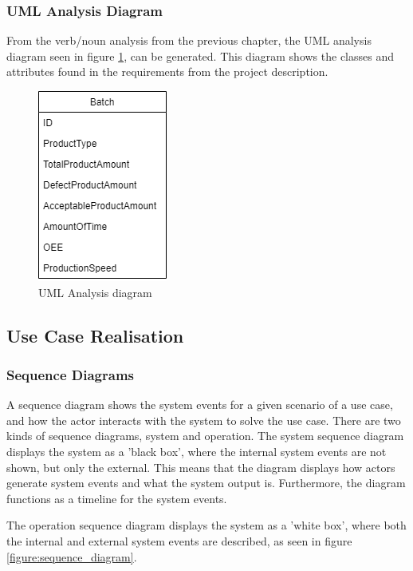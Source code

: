 \subsubsection{UML Analysis Diagram}
From the verb/noun analysis from the previous chapter, the UML analysis diagram
seen in figure \ref{figure:analysis_diagram}, can be generated. This diagram
shows the classes and attributes found in the requirements from the project
description.

\begin{figure}[ht]
	\centering 
	\includegraphics[scale=0.6]{images/diagrams/UML_Analysis_Diagram.drawio.png}
	\caption{UML Analysis diagram}
	\label{figure:analysis_diagram} 
\end{figure}

\subsection{Use Case Realisation}

\subsubsection{Sequence Diagrams}
A sequence diagram shows the system events for a given scenario of a use case,
and how the actor interacts with the system to solve the use case. There are two
kinds of sequence diagrams, system and operation. The system sequence diagram
displays the system as a 'black box', where the internal system events are not
shown, but only the external. This means that the diagram displays how actors
generate system events and what the system output is. Furthermore, the diagram
functions as a timeline for the system events. \\


The operation sequence diagram displays the system as a 'white box', where both
the internal and external system events are described, as seen in figure
\ref{figure:sequence_diagram}.

